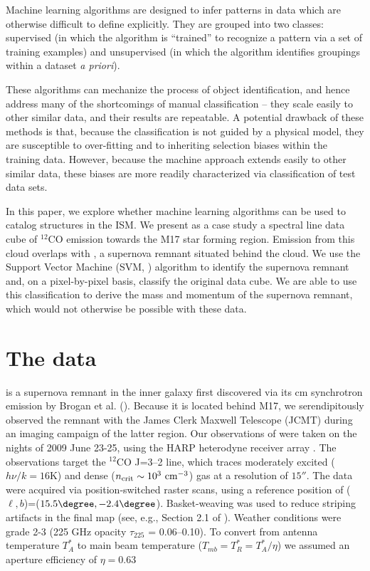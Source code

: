 Machine learning algorithms are designed to infer patterns in data which are otherwise difficult to define explicitly. They are grouped into two classes: supervised (in which the algorithm is ``trained'' to recognize a pattern via a set of training examples) and unsupervised (in which the algorithm identifies groupings within a dataset \textit{a priori}).

These algorithms can mechanize the process of object identification, and hence address many of the shortcomings of manual  classification -- they scale easily to other similar data, and their results are repeatable. A potential drawback of these methods is that, because the classification is not guided by a physical model, they are susceptible to over-fitting and to inheriting selection biases within the training data. However, because the machine approach extends easily to other similar data, these biases are more readily characterized via classification of test data sets.

In this paper, we explore whether machine learning algorithms can be used to catalog structures in the ISM. We present as a case study a spectral line data cube of $^{12}$CO emission towards the M17 star forming region. Emission from this cloud overlaps with \snr{}, a supernova remnant situated behind the cloud. We use the Support Vector Machine (SVM, \citealt{Vapnik95}) algorithm to identify the supernova remnant and, on a pixel-by-pixel basis, classify the original data cube. We are able to use this classification to derive the mass and momentum of the supernova remnant, which would not otherwise be possible with these data.

\section{The data}
\snr{} is a supernova remnant in the inner galaxy first discovered via its cm synchrotron emission by Brogan et al. (\citeyear{brogan06}). Because it is located behind M17, we serendipitously observed the remnant with the James Clerk Maxwell Telescope (JCMT) during an imaging campaign of the latter region. Our observations of \snr{} were taken on the nights of 2009 June 23-25, using the HARP heterodyne receiver array \citep{Smith08}. The observations target the $^{12}$CO J=3--2 line, which traces moderately excited ($h\nu / k=16$K) and dense ($n_{\rm crit} \sim 10^3 ~{\rm cm}^{-3}$) gas at a resolution of $15''$. The data were acquired via position-switched raster scans, using a reference position of ($\ell, b$)=($15.5\degree, -2.4\degree$). Basket-weaving was used to reduce striping artifacts in the final map (see, e.g., Section 2.1 of \citealt{Davis10}). Weather conditions were grade 2-3 (225 GHz opacity $\tau_{225}$ = 0.06--0.10). To convert from antenna temperature $T_A^*$ to main beam temperature ($T_{mb} = T_R^* = T_A^* / \eta$) we assumed an aperture efficiency of $\eta = 0.63$ \citep{Buckle09}

